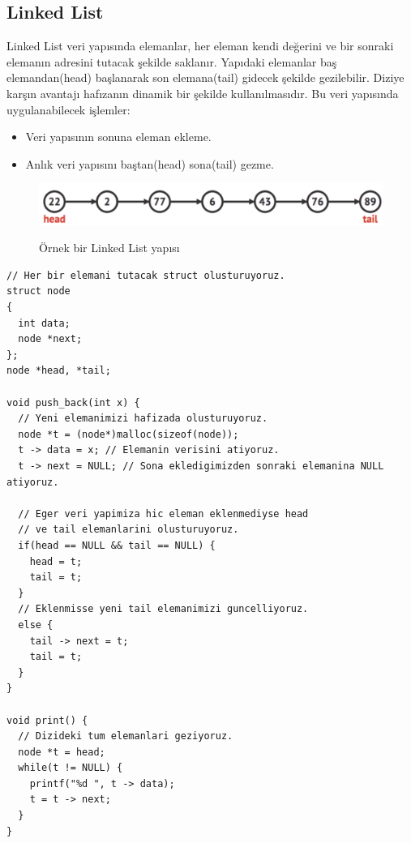 \documentclass[12pt]{article}
\begin{document}
	\subsection{Linked List}
	
	Linked List veri yap{\i}s{\i}nda elemanlar, her eleman kendi de\u{g}erini ve bir sonraki eleman{\i}n adresini tutacak \c{s}ekilde saklan{\i}r. Yap{\i}daki elemanlar ba\c{s} elemandan(head) ba\c{s}lanarak son elemana(tail) gidecek \c{s}ekilde gezilebilir. Diziye kar\c{s}{\i}n avantaj{\i} haf{\i}zan{\i}n dinamik bir \c{s}ekilde kullan{\i}lmas{\i}d{\i}r. Bu veri yap{\i}s{\i}nda uygulanabilecek i\c{s}lemler:
	
	\begin{itemize}
        \item Veri yap{\i}s{\i}n{\i}n sonuna eleman ekleme.
        \item Anl{\i}k veri yap{\i}s{\i}n{\i} ba\c{s}tan(head) sona(tail) gezme.
    \end{itemize}

	\begin{figure}[h]
		\centering
		\includegraphics[width=\linewidth/1]{linkedlist.png}
		\label{fig:linkedlist}
        \caption{\"{O}rnek bir Linked List yap{\i}s{\i}}
	\end{figure}        
    
    \clearpage

    \begin{verbatim}
// Her bir elemani tutacak struct olusturuyoruz.
struct node
{
  int data;
  node *next;
};
node *head, *tail;

void push_back(int x) {
  // Yeni elemanimizi hafizada olusturuyoruz.
  node *t = (node*)malloc(sizeof(node)); 
  t -> data = x; // Elemanin verisini atiyoruz.
  t -> next = NULL; // Sona ekledigimizden sonraki elemanina NULL atiyoruz.

  // Eger veri yapimiza hic eleman eklenmediyse head 
  // ve tail elemanlarini olusturuyoruz.
  if(head == NULL && tail == NULL) {
    head = t;
    tail = t;
  }
  // Eklenmisse yeni tail elemanimizi guncelliyoruz.
  else {
    tail -> next = t; 
    tail = t;
  }
}

void print() {
  // Dizideki tum elemanlari geziyoruz.
  node *t = head;
  while(t != NULL) {
    printf("%d ", t -> data);
    t = t -> next;
  }
}
    \end{verbatim}
\end{document}
